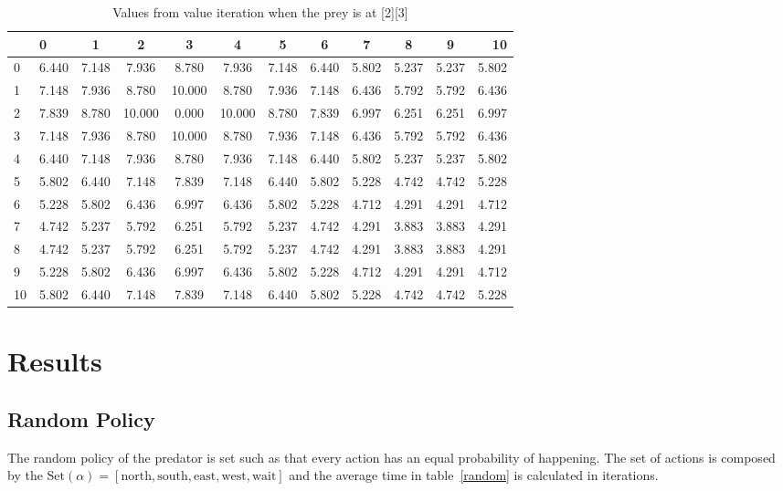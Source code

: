 \documentclass[paper=a4, fontsize=11pt]{scrartcl}
\numberwithin{equation}{section}		%
\numberwithin{figure}{section}			%
\numberwithin{table}{section}				%
\begin{document}
\begin{table}[H]
\caption{Values from value iteration when the prey is at [2][3]}
\centering
\begin{tabular}{l|l*{9}{c}r}
  \hline
 & 0 & 1 & 2 & 3 & 4 & 5 & 6 & 7 & 8 & 9 & 10 \\ \hline 
0 & 6.440 & 7.148 & 7.936 & 8.780 & 7.936 & 7.148 & 6.440 & 5.802 & 5.237 & 5.237 & 5.802 \\
1 & 7.148 & 7.936 & 8.780 & 10.000 & 8.780 & 7.936 & 7.148 & 6.436 & 5.792 & 5.792 & 6.436 \\
2 & 7.839 & 8.780 & 10.000 & 0.000 & 10.000 & 8.780 & 7.839 & 6.997 & 6.251 & 6.251 & 6.997 \\
3 & 7.148 & 7.936 & 8.780 & 10.000 & 8.780 & 7.936 & 7.148 & 6.436 & 5.792 & 5.792 & 6.436 \\
4 & 6.440 & 7.148 & 7.936 & 8.780 & 7.936 & 7.148 & 6.440 & 5.802 & 5.237 & 5.237 & 5.802 \\
5 & 5.802 & 6.440 & 7.148 & 7.839 & 7.148 & 6.440 & 5.802 & 5.228 & 4.742 & 4.742 & 5.228 \\
6 & 5.228 & 5.802 & 6.436 & 6.997 & 6.436 & 5.802 & 5.228 & 4.712 & 4.291 & 4.291 & 4.712 \\
7 & 4.742 & 5.237 & 5.792 & 6.251 & 5.792 & 5.237 & 4.742 & 4.291 & 3.883 & 3.883 & 4.291 \\
8 & 4.742 & 5.237 & 5.792 & 6.251 & 5.792 & 5.237 & 4.742 & 4.291 & 3.883 & 3.883 & 4.291 \\
9 & 5.228 & 5.802 & 6.436 & 6.997 & 6.436 & 5.802 & 5.228 & 4.712 & 4.291 & 4.291 & 4.712 \\
10&5.802 & 6.440 & 7.148 & 7.839 & 7.148 & 6.440 & 5.802 & 5.228 & 4.742 & 4.742 & 5.228
\end{tabular}
\label{rVIt}
\end{table}

\section{Results}
\label{results}

\subsection{Random Policy}
The random policy of the predator is set such as that every action has an equal probability of happening. The set of actions is composed by the $\text{Set}(\alpha) = [\text{north},\text{south},\text{east},\text{west},\text{wait}]$ and the average time in table~\ref{random} is calculated in iterations.
\end{document}
